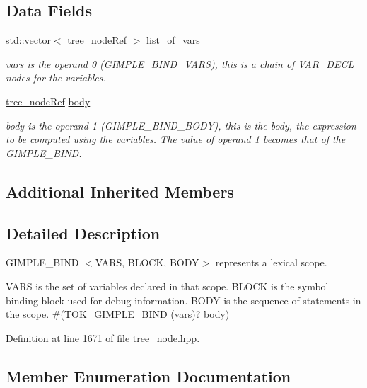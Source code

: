 \subsection*{Data Fields}
\begin{DoxyCompactItemize}
\item 
std\+::vector$<$ \hyperlink{tree__node_8hpp_a6ee377554d1c4871ad66a337eaa67fd5}{tree\+\_\+node\+Ref} $>$ \hyperlink{structgimple__bind_a19461de5e043437e4d852cd2d1223548}{list\+\_\+of\+\_\+vars}
\begin{DoxyCompactList}\small\item\em vars is the operand 0 (G\+I\+M\+P\+L\+E\+\_\+\+B\+I\+N\+D\+\_\+\+V\+A\+RS), this is a chain of V\+A\+R\+\_\+\+D\+E\+CL nodes for the variables. \end{DoxyCompactList}\item 
\hyperlink{tree__node_8hpp_a6ee377554d1c4871ad66a337eaa67fd5}{tree\+\_\+node\+Ref} \hyperlink{structgimple__bind_a24cdde21e41023e335d38bc9ef59daae}{body}
\begin{DoxyCompactList}\small\item\em body is the operand 1 (G\+I\+M\+P\+L\+E\+\_\+\+B\+I\+N\+D\+\_\+\+B\+O\+DY), this is the body, the expression to be computed using the variables. The value of operand 1 becomes that of the G\+I\+M\+P\+L\+E\+\_\+\+B\+I\+ND. \end{DoxyCompactList}\end{DoxyCompactItemize}
\subsection*{Additional Inherited Members}


\subsection{Detailed Description}
G\+I\+M\+P\+L\+E\+\_\+\+B\+I\+ND $<$V\+A\+RS, B\+L\+O\+CK, B\+O\+DY$>$ represents a lexical scope. 

V\+A\+RS is the set of variables declared in that scope. B\+L\+O\+CK is the symbol binding block used for debug information. B\+O\+DY is the sequence of statements in the scope. \#(T\+O\+K\+\_\+\+G\+I\+M\+P\+L\+E\+\_\+\+B\+I\+ND (vars)? body) 

Definition at line 1671 of file tree\+\_\+node.\+hpp.



\subsection{Member Enumeration Documentation}
\mbox{\label{structgimple__bind_a25674d4023cf24f1df44d722285a161a}} 
